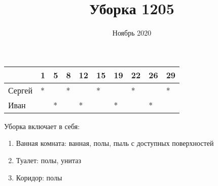 \documentclass[14pt,a4paper]{article}%
\title{Уборка 1205}%
\author{}%
\date{Ноябрь 2020}%
\begin{document}
%
\normalsize%
\maketitle%
\thispagestyle{empty}%
\begin{tabularx}{\textwidth}{|X|X|X|X|X|X|X|X|X|X|}%
\hline%
\textbf{}&\textbf{1}&\textbf{5}&\textbf{8}&\textbf{12}&\textbf{15}&\textbf{19}&\textbf{22}&\textbf{26}&\textbf{29}\\%
\hline%
Сергей&*&&*&&*&&*&&*\\%
\hline%
Иван&&*&&*&&*&&*&\\%
\hline%
\end{tabularx}%
\newline%
\newline%
Уборка включает в себя:%
\begin{enumerate}%
\item%
Ванная комната: ванная, полы, пыль с доступных поверхностей%
\item%
Туалет: полы, унитаз%
\item%
Коридор: полы%
\end{enumerate}%
\end{document}
